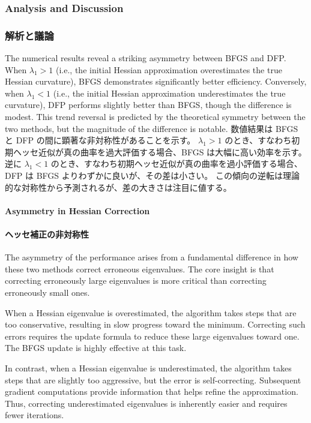 \documentclass[0_main]{subfiles}
\begin{document}
\ifEn
    \subsubsection{Analysis and Discussion}
\else
    \subsubsection{解析と議論}
\fi

\ifEn
    The numerical results reveal a striking asymmetry between BFGS and DFP.
    When $\lambda_1 > 1$ (i.e., the initial Hessian approximation overestimates the true Hessian curvature), BFGS demonstrates significantly better efficiency.
    Conversely, when $\lambda_1 < 1$ (i.e., the initial Hessian approximation underestimates the true curvature), DFP performs slightly better than BFGS, though the difference is modest.
    This trend reversal is predicted by the theoretical symmetry between the two methods, but the magnitude of the difference is notable.
\else
    数値結果は BFGS と DFP の間に顕著な非対称性があることを示す。
    $\lambda_1 > 1$ のとき、すなわち初期ヘッセ近似が真の曲率を過大評価する場合、BFGS は大幅に高い効率を示す。
    逆に $\lambda_1 < 1$ のとき、すなわち初期ヘッセ近似が真の曲率を過小評価する場合、DFP は BFGS よりわずかに良いが、その差は小さい。
    この傾向の逆転は理論的な対称性から予測されるが、差の大きさは注目に値する。
\fi

\ifEn
    \paragraph{Asymmetry in Hessian Correction}
\else
    \paragraph{ヘッセ補正の非対称性}
\fi

\ifEn
    The asymmetry of the performance arises from a fundamental difference in how these two methods correct erroneous eigenvalues.
    The core insight is that correcting erroneously large eigenvalues is more critical than correcting erroneously small ones.

    When a Hessian eigenvalue is overestimated, the algorithm takes steps that are too conservative, resulting in slow progress toward the minimum. Correcting such errors requires the update formula to reduce these large eigenvalues toward one.
    The BFGS update is highly effective at this task.

    In contrast, when a Hessian eigenvalue is underestimated, the algorithm takes steps that are slightly too aggressive, but the error is self-correcting.
    Subsequent gradient computations provide information that helps refine the approximation.
    Thus, correcting underestimated eigenvalues is inherently easier and requires fewer iterations.
\end{document}
